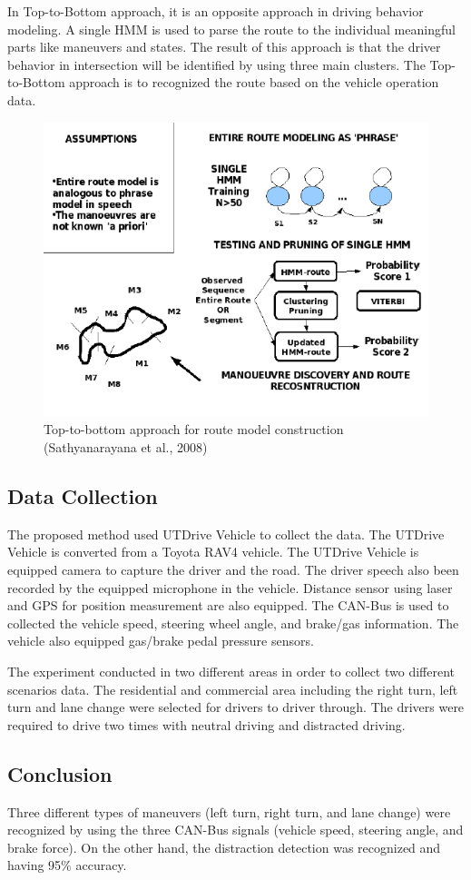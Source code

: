 In Top-to-Bottom approach, it is an opposite approach in driving behavior modeling. A single HMM is used to parse the route to the individual meaningful parts like maneuvers and states. The result of this approach is that the driver behavior in intersection will be identified by using three main clusters. The Top-to-Bottom approach is to recognized the route based on the vehicle operation data.

\begin{figure}[hbt!]\centering
\includegraphics[width=.75\textwidth]{image/ToptoBottom}
\caption{Top-to-bottom approach for route model construction (Sathyanarayana et al., 2008)}
\end{figure}

\subsection{Data Collection}
The proposed method used UTDrive Vehicle to collect the data. The UTDrive Vehicle is converted from a Toyota RAV4 vehicle. The UTDrive Vehicle is equipped camera to capture the driver and the road. The driver speech also been recorded by the equipped microphone in the vehicle. Distance sensor using laser and GPS for position measurement are also equipped. The CAN-Bus is used to collected the vehicle speed, steering wheel angle, and brake/gas information. The vehicle also equipped gas/brake pedal pressure sensors. 

The experiment conducted in two different areas in order to collect two different scenarios data. The residential and commercial area including the right turn, left turn and lane change were selected for drivers to driver through. The drivers were required to drive two times with neutral driving and distracted driving. 
 
\subsection{Conclusion}
Three different types of maneuvers (left turn, right turn, and lane change) were recognized by using the three CAN-Bus signals (vehicle speed, steering angle, and brake force). On the other hand, the distraction detection was recognized and having 95\% accuracy.


